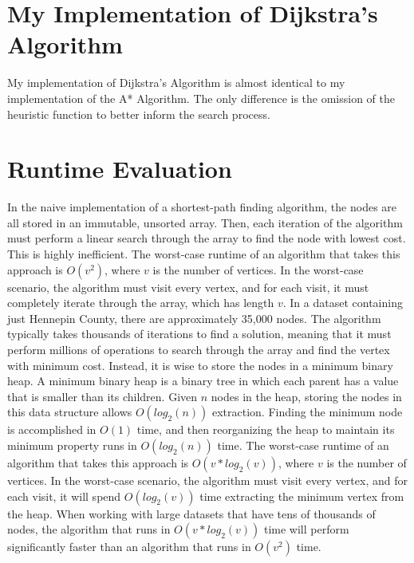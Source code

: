 \documentclass[conference]{IEEEtran}
\begin{document}
\section{My Implementation of Dijkstra's Algorithm}
My implementation of Dijkstra's Algorithm is almost identical to my implementation of the A* Algorithm. The only difference is the omission of the heuristic function to better inform the search process.


\section{Runtime Evaluation}
In the naive implementation of a shortest-path finding algorithm, the nodes are all stored in an immutable, unsorted array. Then, each iteration of the algorithm must perform a linear search through the array to find the node with lowest cost. This is highly inefficient. The worst-case runtime of an algorithm that takes this approach is $O(v^2)$, where $v$ is the number of vertices. In the worst-case scenario, the algorithm must visit every vertex, and for each visit, it must completely iterate through the array, which has length $v$.
\newline
\newline
In a dataset containing just Hennepin County, there are approximately 35,000 nodes. The algorithm typically takes thousands of iterations to find a solution, meaning that it must perform millions of operations to search through the array and find the vertex with minimum cost.
\newline
\newline
Instead, it is wise to store the nodes in a minimum binary heap. A minimum binary heap is a binary tree in which each parent has a value that is smaller than its children. Given $n$ nodes in the heap, storing the nodes in this data structure allows $O(log_2(n))$ extraction. Finding the minimum node is accomplished in $O(1)$ time, and then reorganizing the heap to maintain its minimum property runs in $O(log_2(n))$ time. The worst-case runtime of an algorithm that takes this approach is $O(v * log_2(v))$, where $v$ is the number of vertices. In the worst-case scenario, the algorithm must visit every vertex, and for each visit, it will spend $O(log_2(v))$ time extracting the minimum vertex from the heap.
\newline
\newline
When working with large datasets that have tens of thousands of nodes, the algorithm that runs in $O(v * log_2(v))$ time will perform significantly faster than an algorithm that runs in $O(v^2)$ time.
\end{document}
